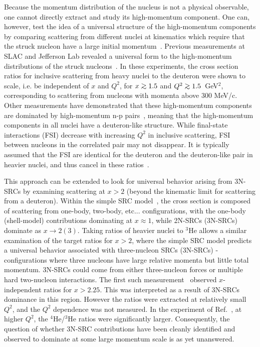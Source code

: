 \documentclass[aps,prl,superscriptaddress,showpacs,twocolumn,floatfix,amsmath,amssymb]{revtex4-1}
\def\gtorder{\mathrel{\raise.3ex\hbox{$>$}\mkern-14mu
 \lower0.6ex\hbox{$\sim$}}}
\begin{document}
Because the momentum distribution of the nucleus is not a physical observable, one cannot directly extract
and study its high-momentum component. One can, however, test the idea of a universal structure of the
high-momentum components by comparing scattering from different nuclei at kinematics which require that the
struck nucleon have a large initial momentum~\cite{RevModPhys.80.189}. Previous measurements at SLAC and
Jefferson Lab revealed a universal form to the high-momentum distributions of the struck
nucleons~\cite{SLAC_Measurement_PRC.48.2451, egiyan2003, PhysRevLett.96.082501, fomin2012, src_john,
arrington99, arrington01}. In these experiments, the cross section ratios for inclusive scattering from
heavy nuclei to the deuteron were shown to scale, i.e. be independent of $x$ and $Q^2$, for $x \gtorder 1.5$
and $Q^2 \gtorder 1.5$~GeV$^2$, corresponding to scattering from nucleons with momenta above 300 MeV/c.
Other measurements have demonstrated that these high-momentum components are dominated by high-momentum n-p
pairs~\cite{aclander99, tang03, Subedi13062008, korover2014, hen14_science, piasetzky06}, meaning that the high-momentum
components in all nuclei have a deuteron-like structure. While final-state interactions (FSI)
decrease with increasing $Q^2$ in inclusive scattering, FSI between nucleons in the correlated pair may not
disappear. It is typically assumed that the FSI are identical for the deuteron and the deuteron-like pair in
heavier nuclei, and thus cancel in these ratios~\cite{RevModPhys.80.189, src_john}.

This approach can be extended to look for universal behavior arising from 3N-SRCs by examining scattering at
$x>2$ (beyond the kinematic limit for scattering from a deuteron). Within the simple SRC
model~\cite{Frankfurt1981215}, the cross section is composed of scattering from one-body, two-body,
etc... configurations, with the one-body (shell-model) contributions dominating at $x \approx 1$, while
2N-SRCs (3N-SRCs) dominate as $x \to 2 (3)$. Taking ratios of heavier nuclei to $^3$He allows a similar
examination of the target ratios for $x>2$, where the simple SRC model predicts a universal behavior
associated with three-nucleon SRCs (3N-SRCs) - configurations where three nucleons have large relative
momenta but little total momentum. 3N-SRCs could come from either three-nucleon forces or multiple hard
two-nucleon interactions. The first such measurement~\cite{PhysRevLett.96.082501} observed $x$-independent
ratios for $x > 2.25$. This was interpreted as a result of 3N-SRCs dominance in this region.
However the ratios were extracted at relatively small $Q^2$, and the $Q^2$ dependence was not measured. In the experiment of Ref.~\cite{fomin2012}, at higher $Q^2$, the $^4$He/$^3$He ratios  were significantly
larger. Consequently, the question of whether 3N-SRC contributions have been cleanly identified and observed
to dominate at some large momentum scale is as yet unanswered.
\end{document}
